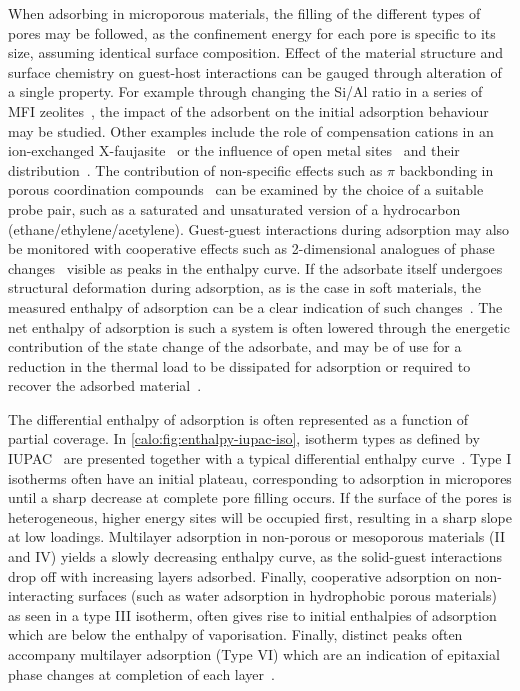 When adsorbing in microporous materials, the filling of the
different types of pores may be followed, as the confinement
energy for each pore is specific to its size, assuming identical
surface composition.
Effect of the material structure and surface chemistry
on guest-host interactions can be gauged through alteration of
a single property. For example through changing the Si/Al ratio
in a series of MFI zeolites~\cite{llewellynAdsorptionMFItypeZeolites1993},
the impact of the adsorbent on the initial adsorption behaviour
may be studied.
Other examples include the role of compensation cations in an
ion-exchanged X-faujasite~\cite{maurinAdsorptionArgonNitrogen2005, %
	maurinInfluenceExtraFrameworkCations2005}
or the influence of open metal sites~\cite{grajciarUnderstandingCOAdsorption2011}
and their distribution~\cite{yoonControlledReducibilityMetalOrganic2010}.
The contribution of non-specific effects such as \( \pi \)
backbonding in porous coordination compounds~\cite{rubesAdsorptionPropanePropylene2013}
can be examined by the choice of a suitable probe pair, such as a saturated
and unsaturated version of a hydrocarbon (ethane/ethylene/acetylene).
Guest-guest interactions during adsorption may also be monitored
with cooperative effects such as 2-dimensional analogues of phase
changes~\cite{rouquerolCalorimetricEvidenceBidimensional1977}
visible as peaks in the enthalpy curve.
If the adsorbate itself undergoes structural deformation during adsorption,
as is the case in soft materials, the measured enthalpy of
adsorption can be a clear indication of such
changes~\cite{bourrellyDifferentAdsorptionBehaviors2005}.
The net enthalpy of adsorption is such a system is often
lowered through the energetic contribution of the state
change of the adsorbate, and may be of use for a reduction in
the thermal load to be dissipated for adsorption or required to
recover the adsorbed material~\cite{masonMethaneStorageFlexible2015}.

The differential enthalpy of adsorption is often represented as a
function of partial coverage. In \autoref{calo:fig:enthalpy-iupac-iso},
isotherm types as defined by IUPAC~\cite{thommesPhysisorptionGasesSpecial2015}
are presented together with a typical differential enthalpy
curve~\cite{llewellynGasAdsorptionMicrocalorimetry2005}. Type I isotherms often
have an initial plateau, corresponding to adsorption in micropores
until a sharp decrease at complete pore filling occurs. If the surface
of the pores is heterogeneous, higher energy sites will be occupied
first, resulting in a sharp slope at low loadings. Multilayer
adsorption in non-porous or mesoporous materials (II and IV) yields
a slowly decreasing enthalpy curve, as the solid-guest interactions
drop off with increasing layers adsorbed. Finally, cooperative adsorption
on non-interacting surfaces (such as water adsorption in hydrophobic porous
materials) as seen in a type III isotherm, often gives rise to initial enthalpies
of adsorption which are below the enthalpy of vaporisation.
Finally, distinct peaks often accompany multilayer adsorption (Type VI)
which are an indication of epitaxial phase
changes at completion of each layer~\cite{llewellynAdsorptionMFItypeZeolites1993, %
	llewellynAdsorptionMFItypeZeolites1993a, %
	rouquerolCalorimetricEvidenceBidimensional1977}.

